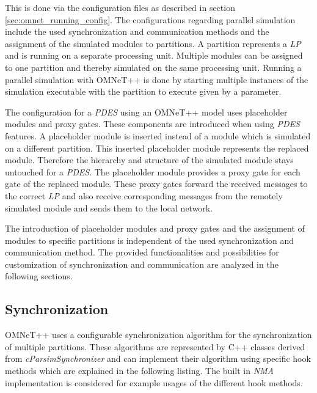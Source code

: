 This is done via the configuration files as described in section \ref{sec:omnet_running_config}.
The configurations regarding parallel simulation include the used synchronization and communication methods and the assignment of the simulated modules to partitions.
A partition represents a \emph{LP} and is running on a separate processing unit.
Multiple modules can be assigned to one partition and thereby simulated on the same processing unit. 
Running a parallel simulation with OMNeT++ is done by starting multiple instances of the simulation executable with the partition to execute given by a parameter.

The configuration for a \emph{PDES} using an OMNeT++ model uses placeholder modules and proxy gates.
These components are introduced when using \emph{PDES} features.
A placeholder module is inserted instead of a module which is simulated on a different partition.
This inserted placeholder module represents the replaced module.
Therefore the hierarchy and structure of the simulated module stays untouched for a \emph{PDES}.
The placeholder module provides a proxy gate for each gate of the replaced module.
These proxy gates forward the received messages to the correct \emph{LP} and also receive corresponding messages from the remotely simulated module and sends them to the local network.
\cite[section III]{varga_parallel_2003} \cite[chapter 16]{omnet_manual}

The introduction of placeholder modules and proxy gates and the assignment of modules to specific partitions is independent of the used synchronization and communication method.
The provided functionalities and possibilities for customization of synchronization and communication are analyzed in the following sections.

\subsection{Synchronization}
\label{sec:parallel_omnet_sync}
OMNeT++ uses a configurable synchronization algorithm for the synchronization of multiple partitions.
These algorithms are represented by C++ classes derived from \emph{cParsimSynchronizer} and can implement their algorithm using specific hook methods which are explained in the following listing.
The built in \emph{NMA} implementation is considered for example usages of the different hook methods.

